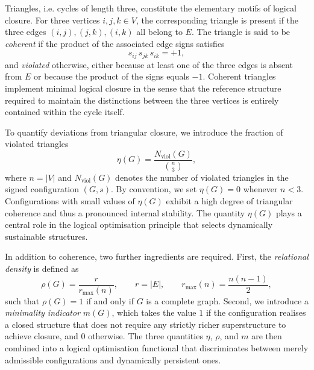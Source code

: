 \documentclass[12pt,a4paper]{article}
\begin{document}
Triangles, i.e. cycles of length three, constitute the elementary motifs of logical closure. For three vertices \(i,j,k\in V\), the corresponding triangle is present if the three edges \((i,j),(j,k),(i,k)\) all belong to \(E\). The triangle is said to be \emph{coherent} if the product of the associated edge signs satisfies
\[
  s_{ij}\,s_{jk}\,s_{ik} = +1,
\]
and \emph{violated} otherwise, either because at least one of the three edges is absent from \(E\) or because the product of the signs equals \(-1\). Coherent triangles implement minimal logical closure in the sense that the reference structure required to maintain the distinctions between the three vertices is entirely contained within the cycle itself.\cite{Laubscher2026IntroPDL,Laubscher2026PDL_English}

To quantify deviations from triangular closure, we introduce the fraction of violated triangles
\[
  \eta(G)
  =
  \frac{N_{\text{viol}}(G)}{\binom{n}{3}},
\]
where \(n = |V|\) and \(N_{\text{viol}}(G)\) denotes the number of violated triangles in the signed configuration \((G,s)\). By convention, we set \(\eta(G)=0\) whenever \(n<3\). Configurations with small values of \(\eta(G)\) exhibit a high degree of triangular coherence and thus a pronounced internal stability. The quantity \(\eta(G)\) plays a central role in the logical optimisation principle that selects dynamically sustainable structures.\cite{Laubscher2026IntroPDL,Laubscher2026PDL_English}

In addition to coherence, two further ingredients are required. First, the \emph{relational density} is defined as
\[
  \rho(G) = \frac{r}{r_{\max}(n)},
  \qquad
  r = |E|,
  \qquad
  r_{\max}(n) = \frac{n(n-1)}{2},
\]
such that \(\rho(G)=1\) if and only if \(G\) is a complete graph. Second, we introduce a \emph{minimality indicator} \(m(G)\), which takes the value \(1\) if the configuration realises a closed structure that does not require any strictly richer superstructure to achieve closure, and \(0\) otherwise. The three quantities \(\eta\), \(\rho\), and \(m\) are then combined into a logical optimisation functional that discriminates between merely admissible configurations and dynamically persistent ones.\cite{Laubscher2026IntroPDL,Laubscher2026PDL_English}
\end{document}

